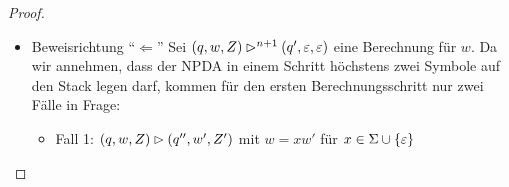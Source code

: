 \begin{proof}
\begin{description}
\begin{itemize}
\begin{itemize}
	  Dann existiert $x \in \Sigma \cup \{\Eps\}$ und $w'\in\Sigma^*$ sodass $w = xw'$ und $[q'', Z', q']\stackrel{n}{\vdash} w'$.
	  Nach I.V.\ gilt nun, dass $(q'', w', Z') \ConfRel^n (q',\Eps,\Eps)$.
	  
	  Nach Konstruktion gilt $(q'', Z')\in\delta(q, x, Z)$ und somit
	  $(q, w, Z) \ConfRel (q'', w', Z') \ConfRel^n (q',\Eps,\Eps)$.
      \item Fall 2: $\alpha$ hat die Form $x[q_1,Z_1,q_2][q_2, Z_2, q']$ ($[q,Z,q']\rightarrow\alpha \in P_2$).
      
      Es gibt also einen Ableitungsbaum $\mathcal{T} = \pi(\mathcal{T}_1,\mathcal{T}_2)$, mit $\mathcal{T}_1 \in \operatorname{Abl}([q_1, Z_1, q_2])$ und $\mathcal{T}_2 \in \operatorname{Abl}([q_2, Z_2, q'])$, sodass $w = xY(\mathcal{T}_1)Y(\mathcal{T}_2)$.
      
      Es gilt also $[q_1, Z_1, q_2]\stackrel{k_1}{\vdash} Y(\mathcal{T}_1)$ und 
      $[q_2, Z_2, q']\stackrel{k_2}{\vdash} Y(\mathcal{T}_2)$ für $k_1,k_2\in\N$, sodass $k_1+k_2=n$.
      
          Per I.V.\ folgt
          \begin{displaymath}
            (q_1, Y(\mathcal{T}_1), Z_1) \ConfRel^{k_1} (q_2, \Eps, \Eps).
          \end{displaymath}
          Mit \autoref{lem:4.mehrKeller} folgt auch
          \begin{displaymath}
            (q_1, Y(\mathcal{T}_1)Y(\mathcal{T}_2), Z_1Z_2) \ConfRel^{k_1} (q_2, Y(\mathcal{T}_2), Z_2).
          \end{displaymath}
          

      Auch hier können wir wieder I.V.\ anwenden und erhalten:
          \begin{displaymath}
            (q_2, Y(\mathcal{T}_2), Z_2) \ConfRel^{k_2} (q', \Eps, \Eps)
          \end{displaymath}
          
                    Somit gilt:
          \begin{displaymath}
            (q, \underbrace{xY(\mathcal{T}_1)Y(\mathcal{T}_2)}_{w}, Z) \ConfRel (q_1, Y(\mathcal{T}_1)Y(\mathcal{T}_2), Z_1Z_2) \ConfRel^{k_1} (q_2, Y(\mathcal{T}_2), Z_2) \ConfRel^{k_2} (q', \Eps, \Eps)
          \end{displaymath}
      \end{itemize}
      
      \item Beweisrichtung "`$\Leftarrow$"'
      Sei $(q,w,Z) \rhd^{n+1} (q',\varepsilon,\varepsilon)$ eine Berechnung für $w$. Da wir annehmen, 
      dass der \ac{NPDA} in einem Schritt höchstens zwei Symbole auf den Stack legen darf, kommen für den ersten Berechnungsschritt nur zwei Fälle in Frage:
      \begin{itemize}
      \item Fall 1: $(q,w,Z)\rhd (q'', w',Z')$ mit $w=xw'$ für $x\in\Sigma\cup\{\Eps\}$
      

\end{itemize}
\end{itemize}
\end{description}
\end{proof}
